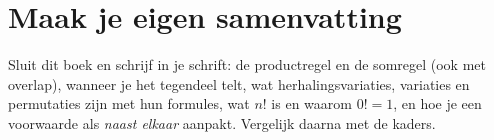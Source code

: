 \begin{oefeningen}







\end{oefeningen}


\ifzelfstudie
\section*{Maak je eigen samenvatting}
Sluit dit boek en schrijf in je schrift: de productregel en de somregel (ook met overlap), wanneer je het tegendeel telt, wat herhalingsvariaties, variaties en permutaties zijn met hun formules, wat $n!$ is en waarom $0! = 1$, en hoe je een voorwaarde als \textit{naast elkaar} aanpakt. Vergelijk daarna met de kaders.
\fi
